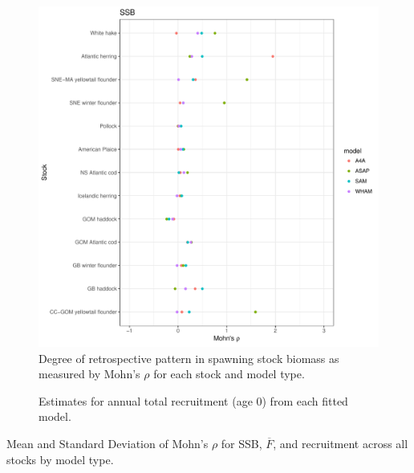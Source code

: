 \documentclass[12pt,letterpaper, leqno]{article}
\begin{document}
\begin{figure}
\caption{Degree of retrospective pattern in spawning stock biomass as measured by Mohn's $\rho$ for each stock and model type.}\label{SSB_compare}
\begin{center}
\includegraphics[width = \textwidth]{../db/ggSSB.pdf}
\end{center}
\end{figure}

\begin{figure}
\caption{Estimates for annual total recruitment (age 0) from each fitted model.}\label{R_compare}
\begin{center}
\end{center}
\end{figure}

\clearpage


\begin{landscape}
\begin{table}
\begin{center}
\caption{Mean and Standard Deviation of Mohn's $\rho$ for SSB, $\overline{F}$, and recruitment across all stocks by model type.}\label{model_compare}

\end{center}
\end{table}
\end{landscape}
\end{document}
